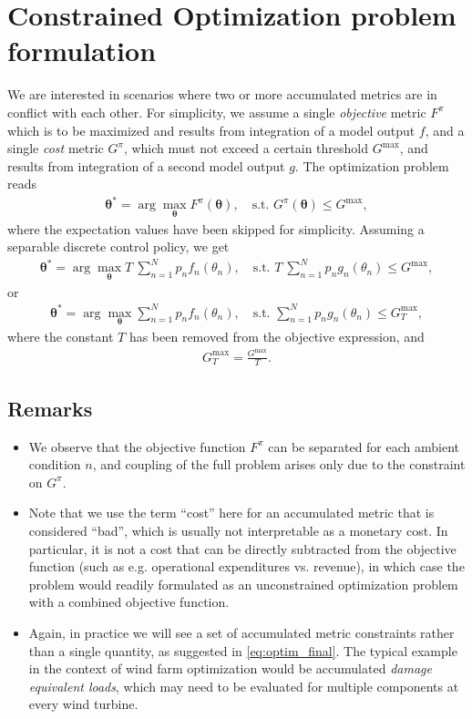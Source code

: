 \documentclass{article}
\begin{document}
\section{Constrained Optimization problem formulation}
We are interested in scenarios where two or more accumulated metrics are in conflict with each other. For simplicity, we assume a single \textit{objective} metric $F^\pi$ which is to be maximized and results from integration of a model output $f$, and a single \textit{cost} metric $G^\pi$, which must not exceed a certain threshold $G^\text{max}$, and results from integration of a second model output $g$. The optimization problem reads
\begin{align}
    \boldsymbol{\theta}^* = \arg \max_{\boldsymbol{\theta}} F^\pi(\boldsymbol{\theta}), \quad \text{s.t. }G^\pi(\boldsymbol{\theta}) \le G^\text{max},
\end{align}
where the expectation values have been skipped for simplicity. Assuming a separable discrete control policy, we get
\begin{align}
    \boldsymbol{\theta}^* = \arg \max_{\boldsymbol{\theta}} T\ \sum_{n = 1}^N p_n f_n(\theta_n), \quad \text{s.t. }T\ \sum_{n = 1}^N p_n g_n(\theta_n) \le G^\text{max},
\end{align}
or 
\begin{align}
    \boldsymbol{\theta}^* = \arg \max_{\boldsymbol{\theta}} \sum_{n = 1}^N p_n f_n(\theta_n), \quad \text{s.t. }\sum_{n = 1}^N p_n g_n(\theta_n) \le G_T^\text{max},\label{eq:optim_final}
\end{align}
where the constant $T$ has been removed from the objective expression, and
\begin{align}
    G_T^\text{max} = \frac{G^\text{max}}{T}.
\end{align}
\subsection*{Remarks}
\begin{itemize}
    \item We observe that the objective function $F^\pi$ can be separated for each ambient condition $n$, and coupling of the full problem arises only due to the constraint on $G^\pi$.
    \item Note that we use the term ``cost'' here for an accumulated metric that is considered ``bad'', which is usually not interpretable as a monetary cost. In particular, it is not a cost that can be directly subtracted from the objective function (such as e.g. operational expenditures vs. revenue), in which case the problem would readily formulated as an unconstrained optimization problem with a combined objective function.
    \item Again, in practice we will see a set of accumulated metric constraints rather than a single quantity, as suggested in \eqref{eq:optim_final}. The typical example in the context of wind farm optimization would be accumulated \textit{damage equivalent loads}, which may need to be evaluated for multiple components at every wind turbine. 
\end{itemize}
\end{document}
